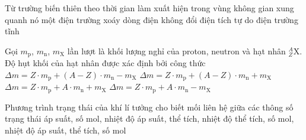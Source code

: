	\begin{ex}%
		Từ trường biến thiên theo thời gian làm xuất hiện trong vùng không gian xung quanh nó một
		\choice
		{\True điện trường xoáy}
		{dòng điện không đổi}
		{điện tích tự do}
		{điện trường tĩnh}
	\end{ex}

	\begin{ex}%
		Gọi $m_\text{p}$, $m_\text{n}$, $m_\text{X}$ lần lượt là khối lượng nghỉ của proton, neutron và hạt nhân ${}^A_Z\text{X}$. Độ hụt khối của hạt nhân được xác định bởi công thức
		\choice
		{\True $\Delta m=Z\cdot m_\text{p}+(A-Z)\cdot m_\text{n}-m_\text{X}$}
		{$\Delta m=Z\cdot m_\text{p}+(A-Z)\cdot m_\text{n}+m_\text{X}$}
		{$\Delta m=Z\cdot m_\text{p}+A\cdot m_\text{n}+m_\text{X}$}
		{$\Delta m=Z\cdot m_\text{p}+A\cdot m_\text{n}-m_\text{X}$}
	\end{ex}

	\begin{ex}%
		Phương trình trạng thái của khí lí tưởng cho biết mối liên hệ giữa các thông số trạng thái
		\choice
		{áp suất, số mol, nhiệt độ}
		{\True áp suất, thể tích, nhiệt độ}
		{thể tích, số mol, nhiệt độ}
		{áp suất, thể tích, số mol}
	\end{ex}

